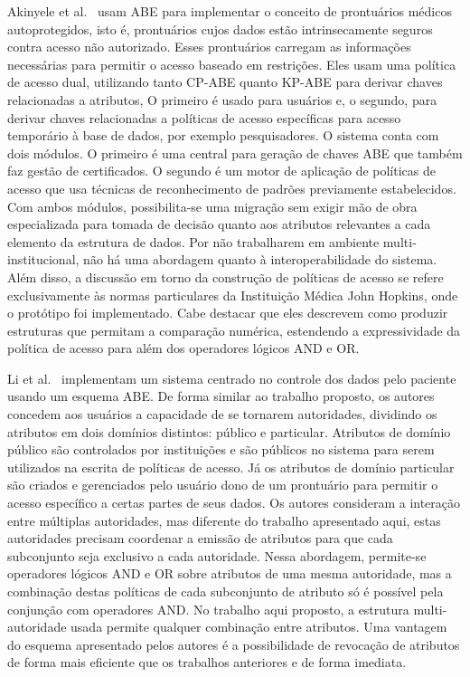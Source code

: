 \documentclass[a4paper,11pt]{article}
\begin{document}
Akinyele et al.~\cite{Akinyele2010} usam ABE para implementar o conceito de prontuários médicos autoprotegidos, isto é, prontuários cujos dados estão intrinsecamente seguros contra acesso não autorizado. Esses prontuários carregam as informações necessárias para permitir o acesso baseado em restrições.%
Eles usam uma política de acesso dual, utilizando tanto CP-ABE quanto KP-ABE para derivar chaves relacionadas a atributos, O primeiro é usado para usuários e, o segundo, para derivar chaves relacionadas a políticas de acesso específicas para acesso temporário à base de dados, por exemplo pesquisadores.
O sistema conta com dois módulos. O primeiro é uma central para geração de chaves ABE que também faz gestão de certificados. O segundo é um motor de aplicação de políticas de acesso que usa técnicas de reconhecimento de padrões previamente estabelecidos. Com ambos módulos, possibilita-se uma migração sem exigir mão de obra especializada para tomada de decisão quanto aos atributos relevantes a cada elemento da estrutura de dados.
Por não trabalharem em ambiente multi-institucional, não há uma abordagem quanto à interoperabilidade do sistema. Além disso, a discussão em torno da construção de políticas de acesso se refere exclusivamente às normas particulares da Instituição Médica John Hopkins, onde o protótipo foi implementado. Cabe destacar que eles descrevem como produzir estruturas que permitam a comparação numérica, estendendo a expressividade da política de acesso para além dos operadores lógicos AND e OR.

Li et al.~\cite{Li2013} implementam um sistema centrado no controle dos dados pelo paciente usando um esquema ABE.
De forma similar ao trabalho proposto, os autores concedem aos usuários a capacidade de se tornarem autoridades, dividindo os atributos em dois domínios distintos: público e particular.
Atributos de domínio público são controlados por instituições e são públicos no sistema para serem utilizados na escrita de políticas de acesso. Já os atributos de domínio particular são criados e gerenciados pelo usuário dono de um prontuário para permitir o acesso específico a certas partes de seus dados.
Os autores consideram a interação entre múltiplas autoridades, mas diferente do trabalho apresentado aqui, estas autoridades precisam coordenar a emissão de atributos para que cada subconjunto seja exclusivo a cada autoridade.
Nessa abordagem, permite-se operadores lógicos AND e OR sobre atributos de uma mesma autoridade, mas a combinação destas políticas de cada subconjunto de atributo só é possível pela conjunção com operadores AND. No trabalho aqui proposto, a estrutura multi-autoridade usada permite qualquer combinação entre atributos.
Uma vantagem do esquema apresentado pelos autores é a possibilidade de revocação de atributos de forma mais eficiente que os trabalhos anteriores e de forma imediata.
\end{document}
